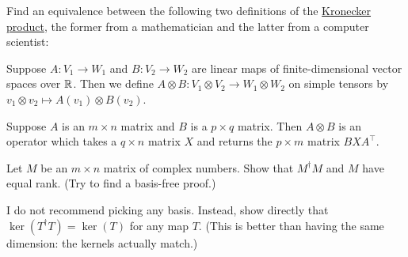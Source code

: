\begin{problem}
	\onechili
	Find an equivalence between the following two definitions of the
	\href{https://en.wikipedia.org/wiki/Kronecker_product}{Kronecker product},
	the former from a mathematician and the latter from a computer scientist:
	\begin{itemize}
		\ii Suppose $A \colon V_1 \to W_1$ and $B \colon V_2 \to W_2$
		are linear maps of finite-dimensional vector spaces over $\mathbb R$.
		Then we define $A \otimes B \colon V_1 \otimes V_2 \to W_1 \otimes W_2$
		on simple tensors by $v_1 \otimes v_2 \mapsto A(v_1) \otimes B(v_2)$.

		\ii Suppose $A$ is an $m \times n$ matrix and $B$ is a $p \times q$ matrix.
		Then $A \otimes B$ is an operator which takes a $q \times n$ matrix $X$
		and returns the $p \times m$ matrix $BXA^\top$.
	\end{itemize}
\end{problem}

\begin{dproblem}
	\label{prob:rank_Mdagger_M}
	Let $M$ be an $m \times n$ matrix of complex numbers.
	Show that $M^\dagger M$ and $M$ have equal rank.
	(Try to find a basis-free proof.)
	\begin{hint}
		I do not recommend picking any basis.
		Instead, show directly that $\ker(T^\dagger T) = \ker(T)$ for any map $T$.
		(This is better than having the same dimension: the kernels actually match.)
	\end{hint}
\end{dproblem}
